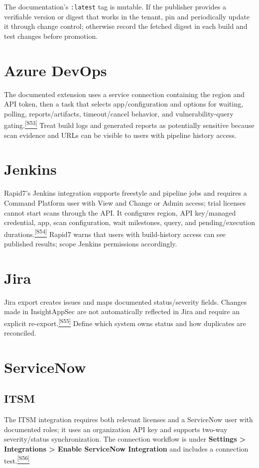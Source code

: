 \documentclass[11pt,letterpaper,oneside]{scrreprt}
\newcommand{\src}[1]{\hyperref[src:#1]{\textsuperscript{\color{R7Orange}[#1]}}}
\newcommand{\uipath}[1]{\textsf{\textbf{#1}}}
\newcommand{\code}[1]{\texttt{#1}}
\begin{document}
\begin{oprec}
The documentation's \code{:latest} tag is mutable. If the publisher provides a verifiable version or digest that works in the tenant, pin and periodically update it through change control; otherwise record the fetched digest in each build and test changes before promotion.
\end{oprec}

\section{Azure DevOps}
The documented extension uses a service connection containing the region and API token, then a task that selects app/configuration and options for waiting, polling, reports/artifacts, timeout/cancel behavior, and vulnerability-query gating.\src{S53} Treat build logs and generated reports as potentially sensitive because scan evidence and URLs can be visible to users with pipeline history access.

\section{Jenkins}
Rapid7's Jenkins integration supports freestyle and pipeline jobs and requires a Command Platform user with View and Change or Admin access; trial licenses cannot start scans through the API. It configures region, API key/managed credential, app, scan configuration, wait milestones, query, and pending/execution durations.\src{S54} Rapid7 warns that users with build-history access can see published results; scope Jenkins permissions accordingly.

\section{Jira}
Jira export creates issues and maps documented status/severity fields. Changes made in InsightAppSec are not automatically reflected in Jira and require an explicit re-export.\src{S55} Define which system owns status and how duplicates are reconciled.

\section{ServiceNow}
\subsection{ITSM}
The ITSM integration requires both relevant licenses and a ServiceNow user with documented roles; it uses an organization API key and supports two-way severity/status synchronization. The connection workflow is under \uipath{Settings > Integrations > Enable ServiceNow Integration} and includes a connection test.\src{S56}
\end{document}
